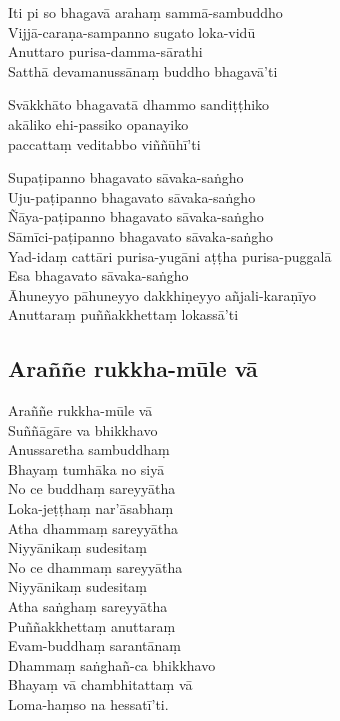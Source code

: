 \begin{paritta}
Iti pi so bhagavā arahaṃ sammā-sambuddho\\
Vijjā-caraṇa-sampanno sugato loka-vidū\\
Anuttaro purisa-damma-sārathi\\
Satthā devamanussānaṃ buddho bhagavā'ti

Svākkhāto bhagavatā dhammo sandiṭṭhiko\\
\vin akāliko ehi-passiko opanayiko\\
paccattaṃ veditabbo viññūhī'ti

Supaṭipanno bhagavato sāvaka-saṅgho\\
Uju-paṭipanno bhagavato sāvaka-saṅgho\\
Ñāya-paṭipanno bhagavato sāvaka-saṅgho\\
Sāmīci-paṭipanno bhagavato sāvaka-saṅgho\\
Yad-idaṃ cattāri purisa-yugāni aṭṭha purisa-puggalā\\
Esa bhagavato sāvaka-saṅgho\\
Āhuneyyo pāhuneyyo dakkhiṇeyyo añjali-karaṇīyo\\
Anuttaraṃ puññakkhettaṃ lokassā'ti

\subsection{Araññe rukkha-mūle vā}


\begin{paritta}
Araññe rukkha-mūle vā\\
Suññāgāre va bhikkhavo\\
Anussaretha sambuddhaṃ\\
Bhayaṃ tumhāka no siyā\\
No ce buddhaṃ sareyyātha\\
Loka-jeṭṭhaṃ nar'āsabhaṃ\\
Atha dhammaṃ sareyyātha\\
Niyyānikaṃ sudesitaṃ\\
No ce dhammaṃ sareyyātha\\
Niyyānikaṃ sudesitaṃ\\
Atha saṅghaṃ sareyyātha\\
Puññakkhettaṃ anuttaraṃ\\
Evam-buddhaṃ sarantānaṃ\\
Dhammaṃ saṅghañ-ca bhikkhavo\\
Bhayaṃ vā chambhitattaṃ vā\\
Loma-haṃso na hessatī'ti.
\end{paritta}


\end{paritta}
